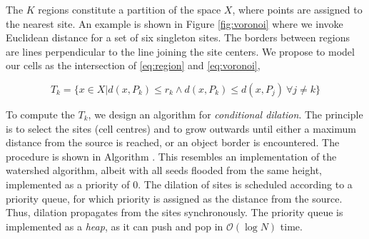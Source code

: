 The $K$ regions constitute a partition of the space $X$, where points are assigned to the nearest site. An example is shown in Figure \ref{fig:voronoi} where we invoke Euclidean distance for a set of six singleton sites. The borders between regions are lines perpendicular to the line joining the site centers. We propose to model our cells as the intersection of \ref{eq:region} and \ref{eq:voronoi},

\begin{equation}
T_k = \Big\{x \in X | d(x, P_k) \leq r_k \land d(x, P_k) \leq d(x, P_j) \  \forall j \neq k \Big\}
\label{eq:conditional_dilation}
\end{equation}


To compute the $T_k$, we design an algorithm for \emph{conditional dilation}. The principle is to select the sites (cell centres) and to grow outwards until either a maximum distance from the source is reached, or an object border is encountered. The procedure is shown in Algorithm \label{alg:ConditionalDilation}. This resembles an implementation of the watershed algorithm, albeit with all seeds flooded from the same height, implemented as a priority of $0$. The dilation of sites is scheduled according to a priority queue, for which priority is assigned as the distance from the source. Thus, dilation propagates from the sites synchronously. The priority queue is implemented as a \emph{heap}, as it can push and pop in $\mathcal{O}(\log N)$ time.


